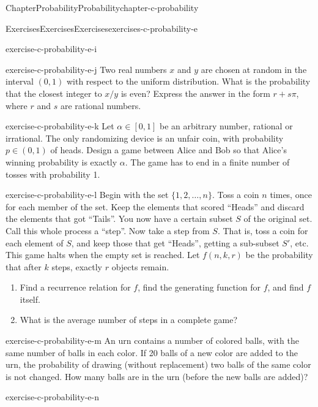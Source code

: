 \documentclass[oneside,10pt,]{book}
\numberwithin{equation}{section}
\begin{document}
\begin{chapterptx}{Chapter}{Probability}{}{Probability}{}{}{chapter-c-probability}
\begin{exercises-section}{Exercises}{Exercises}{}{Exercises}{}{}{exercises-c-probability-e}
\begin{divisionexercise}{8}{}{}{exercise-c-probability-e-i}
\end{divisionexercise}%
\begin{divisionexercise}{9}{}{}{exercise-c-probability-e-j}%
Two real numbers \(x\) and \(y\) are chosen at random in the interval \((0,1)\) with respect to the uniform distribution. What is the probability that the closest integer to \(x/y\) is even? Express the answer in the form \(r + s \pi\), where \(r\) and \(s\) are rational numbers.%
\end{divisionexercise}%
\begin{divisionexercise}{10}{}{}{exercise-c-probability-e-k}%
Let \(\alpha  \in  [0,1]\) be an arbitrary number, rational or irrational. The only randomizing device is an unfair coin, with probability \(p \in (0,1)\) of heads. Design a game between Alice and Bob so that Alice's winning probability is exactly \(\alpha\). The game has to end in a finite number of tosses with probability 1.%
\end{divisionexercise}%
\begin{divisionexercise}{11}{}{}{exercise-c-probability-e-l}%
Begin with the set \(\{1,2,\dots,n\}\). Toss a coin \(n\) times, once for each member of the set. Keep the elements that scored ``Heads'' and discard the elements that got ``Tails''. You now have a certain subset \(S\) of the original set. Call this whole process a ``step''. Now take a step from \(S\). That is, toss a coin for each element of \(S\), and keep those that get ``Heads'', getting a sub-subset \(S'\), etc. This game halts when the empty set is reached. Let \(f(n,k,r)\) be the probability that after \(k\) steps, exactly \(r\) objects remain.%
\begin{enumerate}[label=(\alph*)]
\item{}Find a recurrence relation for \(f\), find the generating function for \(f\), and find \(f\) itself.%
\item{}What is the average number of steps in a complete game?%
\end{enumerate}
%
\end{divisionexercise}%
\begin{divisionexercise}{12}{}{}{exercise-c-probability-e-m}%
An urn contains a number of colored balls, with the same number of balls in each color. If 20 balls of a new color are added to the urn, the probability of drawing (without replacement) two balls of the same color is not changed. How many balls are in the urn (before the new balls are added)?%
\end{divisionexercise}%
\begin{divisionexercise}{13}{}{}{exercise-c-probability-e-n}%

\end{divisionexercise}
\end{exercises-section}
\end{chapterptx}
\end{document}
